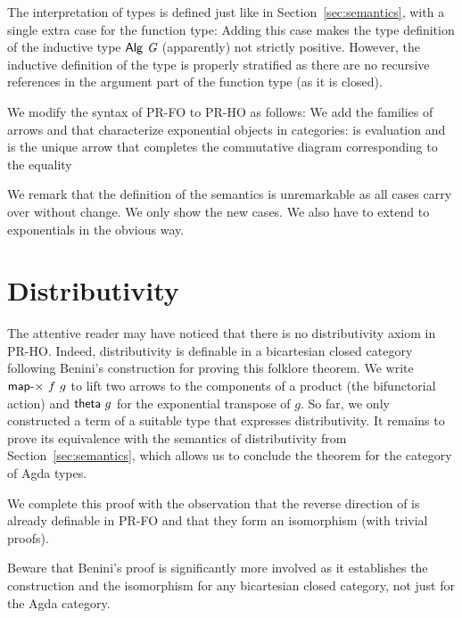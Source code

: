 \documentclass[a4paper,USenglish,cleveref, autoref, thm-restate]{lipics-v2021}
\begin{document}
The interpretation of types is defined just like in
Section~\ref{sec:semantics}, with a single extra case for the function type:
\cccDataAlgArrow
Adding this case makes the type definition of the inductive type
${\AAlg{~G}}$ (apparently) not strictly positive. However, the
inductive definition of the type is properly stratified as there are
no recursive references in the argument part of the function type (as
it is closed).

We modify the syntax of PR-FO to PR-HO as follows:
\cccPRIND
We add the families of arrows {\Alam} and {\Aapply} that characterize
exponential objects in categories: {\Aapply} is evaluation and {\Alam}
is the unique arrow that completes the commutative diagram
corresponding to the equality
\cccExpComm

We remark that the definition of the semantics is
unremarkable as all cases carry over without change. We only show the
new cases. 
\cccEvalExponential
We also have to extend {\Afmap} to exponentials in the obvious way.

\section{Distributivity}
\label{sec:distributivity}


The attentive reader may have noticed that there is no
distributivity axiom in PR-HO.
Indeed, distributivity is definable in a bicartesian closed category
following Benini's construction
\cite{https://doi.org/10.48550/arxiv.1406.0961} for proving this
folklore theorem. We write ${\Amapx}~f ~g $ to lift two arrows to the
components of a product (the bifunctorial action) and ${\Atheta}~g$ for
the exponential transpose of $g$.
\cccThetaDist
So far, we only constructed a term {\Adist} of a suitable type that expresses
distributivity. It remains to prove its equivalence with the semantics of
distributivity from Section~\ref{sec:semantics}, which allows us to conclude
the theorem for the category of Agda types. 
\cccEvalDistEqual

We complete this proof with the observation that the reverse direction
of {\Adist} is already definable in PR-FO and that they form an
isomorphism (with trivial proofs).
\cccUndist
\vspace{-2\baselineskip}
\cccDistUndist

Beware that Benini's proof
\cite{https://doi.org/10.48550/arxiv.1406.0961} is significantly more
involved as it establishes the construction and the isomorphism for
any bicartesian closed category, not just for the Agda category.
\end{document}

